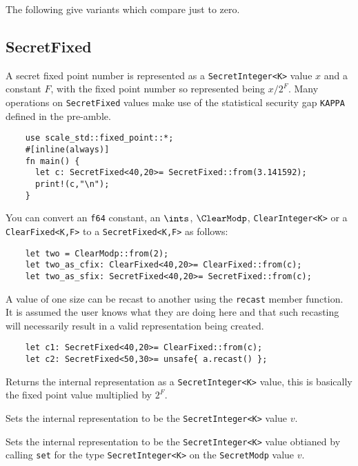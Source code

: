 \noindent
The following give variants which compare just to zero.



\subsection{SecretFixed}
A secret fixed point number is represented as a \verb|SecretInteger<K>| value $x$ and
a constant $F$, with the fixed point number so represented being $x/2^F$.
Many operations on \verb|SecretFixed| values make use of the statistical
security gap \verb|KAPPA| defined in the pre-amble.

\begin{lstlisting}
    use scale_std::fixed_point::*;
    #[inline(always)]
    fn main() {
      let c: SecretFixed<40,20>= SecretFixed::from(3.141592);
      print!(c,"\n");
    }
\end{lstlisting}

You can convert an \verb|f64| constant, an $\ints$,  $\ClearModp$,
\verb|ClearInteger<K>| or a \verb|ClearFixed<K,F>| to a \verb|SecretFixed<K,F>| as follows:
\begin{lstlisting}
    let two = ClearModp::from(2);
    let two_as_cfix: ClearFixed<40,20>= ClearFixed::from(c);
    let two_as_sfix: SecretFixed<40,20>= SecretFixed::from(c);
\end{lstlisting}

A value of one size can be recast to another using the \verb|recast|
member function. It is assumed the user knows what they are doing here
and that such recasting will necessarily result in a valid representation
being created.
\begin{lstlisting}
    let c1: SecretFixed<40,20>= ClearFixed::from(c);
    let c2: SecretFixed<50,30>= unsafe{ a.recast() };
\end{lstlisting}

Returns the internal representation as a \verb|SecretInteger<K>| value,
this is basically the fixed point value multiplied by $2^F$.

Sets the internal representation to be the \verb|SecretInteger<K>| value $v$.

Sets the internal representation to be the \verb|SecretInteger<K>| value obtianed by calling \verb|set| for the type
\verb|SecretInteger<K>| on the \verb|SecretModp| value $v$.

